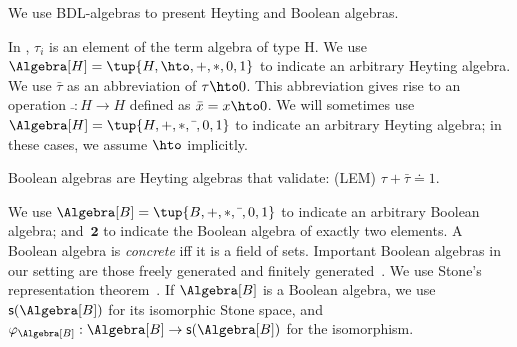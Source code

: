 We use BDL-algebras to present Heyting and Boolean algebras. 

\medskip 
{}
\medskip

In , $\tau_i$ is an element of the term algebra of type $\mathrm{H}$.
We use $\Algebra[H] = \tup{H, {\hto}, {+}, {*}, {0}, {1}}$ to indicate an arbitrary Heyting algebra.
We use $\bar{\tau}$ as an abbreviation of $\tau \hto 0$.
This abbreviation gives rise to an operation $\bar{~} : {H \to H}$ defined as $\bar{x} = {x \hto 0}$.
We will sometimes use $\Algebra[H] = \tup{H, {+}, {*}, \bar{~}, {0}, {1}}$ to indicate an arbitrary Heyting algebra; in these cases, we assume $\hto$ implicitly.

\medskip
\begin{definition}\label{definition:boolean:algebra}
	Boolean algebras are Heyting algebras that validate: (LEM) $\tau + \bar{\tau} \doteq 1$.
\end{definition}
\medskip

We use $\Algebra[B] = \tup{B, {+}, {*}, {\bar{~}}, {0}, {1}}$ to indicate an arbitrary Boolean algebra; and~$\mathbf{2}$ to indicate the Boolean algebra of exactly two elements.
A Boolean algebra is \emph{concrete} iff it is a field of sets.
Important Boolean algebras in our setting are those freely generated and finitely generated~\cite{Halmos:2009}.
We use  Stone's representation theorem~\cite{Stone36}.
If $\Algebra[B]$ is a Boolean algebra, we use $\mathsf{s}(\Algebra[B])$ for its isomorphic Stone space, and ${\mathbf{\varphi}_{\Algebra[B]}: \Algebra[B] \to \mathsf{s}(\Algebra[B])}$ for the isomorphism.

